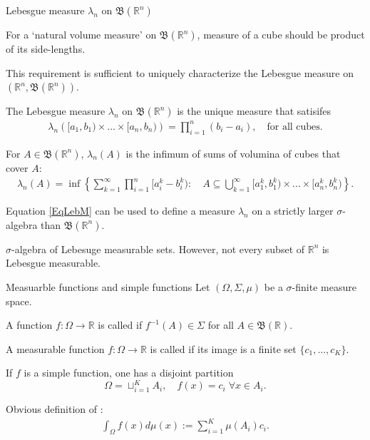 \begin{frame}{Lebesgue measure $\lambda_n$ on $\mathfrak{B}(\mathbb{R}^n)$}
\bit
\item For a `natural volume measure' on $\mathfrak{B}(\mathbb{R}^n)$,  
measure of a cube should be product of its side-lengths. 
\item This requirement is sufficient to uniquely characterize the Lebesgue measure on $\left(\mathbb{R}^n, \mathfrak{B}(\mathbb{R}^n)\right)$. 
\item[\iarrow] The Lebesgue measure $\lambda_n$ on $\mathfrak{B}(\mathbb{R}^n)$ is the unique measure that 
satisifes
\begin{align*}
\lambda_n\left([a_1,b_1)\times\dots\times[a_n,b_n)\right)=\prod_{i=1}^n(b_i-a_i), \quad\text{for all cubes}. 
\end{align*}
\eit
\vspace{-0.2cm}
\bit
\item For $A\in\mathfrak{B}(\mathbb{R}^n)$, $\lambda_n(A)$ is the infimum of 
sums of volumina of cubes that cover $A$: 
\begin{align}\label{EqLebM}
\lambda_n(A)=\inf\left\{\sum_{k=1}^\infty \prod_{i=1}^n[a^k_i-b^k_i)\colon\quad A\subseteq\bigcup_{k=1}^\infty [a_1^k,b_1^k)\times\dots\times [a_n^k,b_n^k)\right\}.
\end{align}
\item Equation \eqref{EqLebM} can be used to define a measure $\lambda_n$ on a strictly larger $\sigma$-algebra than $\mathfrak{B}(\mathbb{R}^n)$.
\item $\sigma$-algebra of Lebesuge measurable sets. However, not every subset of $\mathbb{R}^n$ is Lebesgue measurable. 
\eit


\end{frame}




\begin{frame}{Measuarble functions and simple functions} 
Let $(\Omega,\Sigma,\mu)$ be a $\sigma$-finite measure space. 

\bit
\item A function $f:\Omega\to\mathbb{R}$ is called  if 
$f^{-1}(A)\in\Sigma$ for all $A\in\mathfrak{B}(\mathbb{R})$. 
\item A measurable function $f: \Omega\to\mathbb{R}$ is called  if 
its image is a finite set $\{c_1,\dots,c_K\}$.  
\item  If $f$ is a simple function, one has a disjoint partition
\[
\Omega=\sqcup_{i=1}^KA_i,\quad f(x)=c_i\; \forall x \in A_i. 
\]
\item [\iarrow] Obvious definition of :
\begin{align*}
\int_{\Omega}f(x)d\mu(x):=\sum_{i=1}^K\mu(A_i)c_i. 
\end{align*}
\eit
\end{frame}

